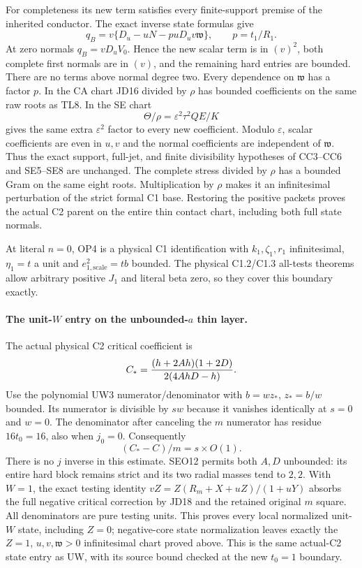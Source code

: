 For completeness its new term satisfies every finite-support premise
of the inherited conductor.  The exact inverse state formulas give
\[
 q_B=v\{D_u-uN-puD_uv\mathfrak w\},\qquad p=t_1/R_1.
                                                               \tag{JD17}
\]
At zero normals $q_B=vD_uV_0$.  Hence the new scalar term is in
$(v)^2$, both complete first normals are in $(v)$, and the remaining
hard entries are bounded.  There are no terms above normal degree
two.  Every dependence on $\mathfrak w$ has a factor $p$.
In the CA chart JD16 divided by $\rho$ has bounded coefficients
on the same raw roots as TL8.  In the SE chart
\[
 \Theta/\rho=\varepsilon^2\tau^2QE/K
\]
gives the same extra $\varepsilon^2$ factor to every new coefficient.
Modulo $\varepsilon$, scalar coefficients are even in $u,v$ and
the normal coefficients are independent of $\mathfrak w$.
Thus the exact support, full-jet, and finite divisibility hypotheses
of CC3--CC6 and SE5--SE8 are unchanged.  The complete stress divided
by $\rho$ has a bounded Gram on the same eight roots.  Multiplication
by $\rho$ makes it an infinitesimal perturbation of the strict formal
C1 base.  Restoring the positive packets proves the actual C2 parent
on the entire thin contact chart, including both full state normals.

At literal $n=0$, OP4 is a physical C1 identification with
$k_1,\zeta_1,r_1$ infinitesimal, $\eta_1=t$ a unit and
$e_{1,\mathrm{scale}}^2=tb$ bounded.  The physical C1.2/C1.3
all-tests theorems allow arbitrary positive $J_1$ and literal beta
zero, so they cover this boundary exactly.

\paragraph{The unit-$W$ entry on the unbounded-$a$ thin layer.}
The actual physical C2 critical coefficient is
\[
 C_*={(h+2Ah)(1+2D)\over2(4AhD-h)}.
\]
Use the polynomial UW3 numerator/denominator with $b=wz_*$,
$z_*=b/w$ bounded.  Its numerator is divisible by $sw$ because it
vanishes identically at $s=0$ and $w=0$.  The denominator after
canceling the $m$ numerator has residue $16t_0=16$, also when
$j_0=0$.  Consequently
\[
                   (C_*-C)/m=s\times O(1).            \tag{JD18}
\]
There is no $j$ inverse in this estimate.  SEO12 permits both $A,D$
unbounded: its entire hard block remains strict and its two radial
masses tend to $2,2$.  With $W=1$, the exact testing identity
$vZ=Z(R_m+X+uZ)/(1+uY)$ absorbs the full negative critical correction
by JD18 and the retained original $m$ square.  All denominators are
pure testing units.  This proves every local normalized unit-$W$
state, including $Z=0$; negative-core state normalization leaves
exactly the $Z=1$, $u,v,\mathfrak w>0$ infinitesimal chart proved
above.  This is the same actual-C2 state entry as UW, with its
source bound checked at the new $t_0=1$ boundary.

